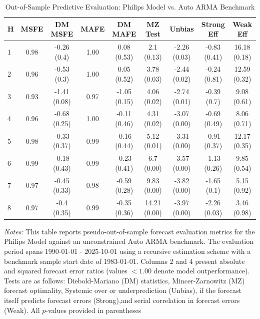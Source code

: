 \begin{table}[htbp]
\centering
\caption{Out-of-Sample Predictive Evaluation: Philips Model vs. Auto ARMA Benchmark}
\label{tab:philips_model_evaluation}
\footnotesize
\begin{tabular}{l cccccccc}
\hline\hline
\rule{0pt}{3ex}
\textbf{H} & \textbf{MSFE} & \textbf{DM MSFE} & \textbf{MAFE} & \textbf{DM MAFE} & \textbf{MZ Test} & \textbf{Unbias} & \textbf{Strong Eff} & \textbf{Weak Eff} \\[0.5ex]
\hline
\rule{0pt}{2.5ex}
1 & 0.98 & -0.26 (0.4) & 1.00 & 0.08 (0.53) & 2.1 (0.13) & -2.26 (0.03) & -0.83 (0.41) & 16.18 (0.18) \\
2 & 0.96 & -0.53 (0.3) & 1.00 & 0.05 (0.52) & 3.78 (0.03) & -2.44 (0.02) & -0.24 (0.81) & 12.59 (0.32) \\
3 & 0.93 & -1.41 (0.08) & 0.97 & -1.05 (0.15) & 4.06 (0.02) & -2.74 (0.01) & -0.39 (0.7) & 9.08 (0.61) \\
4 & 0.96 & -0.68 (0.25) & 1.00 & -0.11 (0.46) & 4.31 (0.02) & -3.07 (0.00) & -0.69 (0.49) & 8.06 (0.71) \\
5 & 0.98 & -0.33 (0.37) & 0.99 & -0.16 (0.44) & 5.12 (0.01) & -3.31 (0.00) & -0.91 (0.37) & 12.17 (0.35) \\
6 & 0.99 & -0.18 (0.43) & 0.99 & -0.23 (0.41) & 6.7 (0.00) & -3.57 (0.00) & -1.13 (0.26) & 9.85 (0.54) \\
7 & 0.97 & -0.45 (0.33) & 0.98 & -0.59 (0.28) & 9.83 (0.00) & -3.82 (0.00) & -1.65 (0.1) & 5.15 (0.92) \\
8 & 0.97 & -0.4 (0.35) & 0.99 & -0.35 (0.36) & 14.21 (0.00) & -3.97 (0.00) & -2.26 (0.03) & 3.46 (0.98) \\
\hline\hline
\end{tabular}%
\par\smallskip
\parbox{\textwidth}{\scriptsize \textit{Notes:} This table reports pseudo-out-of-sample forecast evaluation metrics for the Philips Model against an unconstrained Auto ARMA benchmark. The evaluation period spans 1990-01-01 - 2025-10-01 using a recursive estimation scheme with a benchmark sample start date of 1983-01-01. Columns 2 and 4 present absolute and squared forecast error ratios (values $< 1.00$ denote model outperformance). Tests are as follows: Diebold-Mariano (DM) statistics, Mincer-Zarnowitz (MZ) forecast optimality, Systemic over or underprediction (Unbias), if the forecast itself predicts forecast errors (Strong),and serial correlation in forecast errors (Weak). All $p$-values provided in parentheses}
\end{table}
